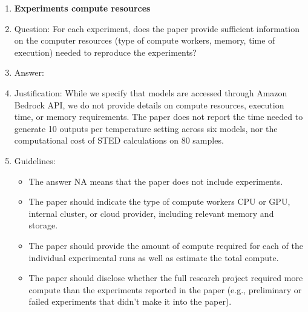 \documentclass{article}
\begin{document}
\begin{enumerate}
\item {\bf Experiments compute resources}
    \item[] Question: For each experiment, does the paper provide sufficient information on the computer resources (type of compute workers, memory, time of execution) needed to reproduce the experiments?
    \item[] Answer: \answerNo{} %
    \item[] Justification: \justification While we specify that models are accessed through Amazon Bedrock API, we do not provide details on compute resources, execution time, or memory requirements. The paper does not report the time needed to generate 10 outputs per temperature setting across six models, nor the computational cost of STED calculations on 80 samples.{}
    \item[] Guidelines:
    \begin{itemize}
        \item The answer NA means that the paper does not include experiments.
        \item The paper should indicate the type of compute workers CPU or GPU, internal cluster, or cloud provider, including relevant memory and storage.
        \item The paper should provide the amount of compute required for each of the individual experimental runs as well as estimate the total compute. 
        \item The paper should disclose whether the full research project required more compute than the experiments reported in the paper (e.g., preliminary or failed experiments that didn't make it into the paper). 
    \end{itemize}
    

\end{enumerate}
\end{document}
